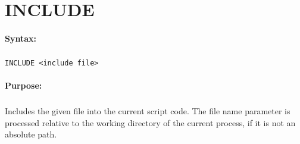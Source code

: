 
\newpage
\section{INCLUDE}
\label{cmd:INCLUDE}

\paragraph{Syntax:}
\subparagraph{}
\texttt{INCLUDE <include file>}

\paragraph{Purpose:}
\subparagraph{}
Includes the given file into the current script code. The file name parameter 
is processed relative to the working directory of the current process, if it 
is not an absolute path.
